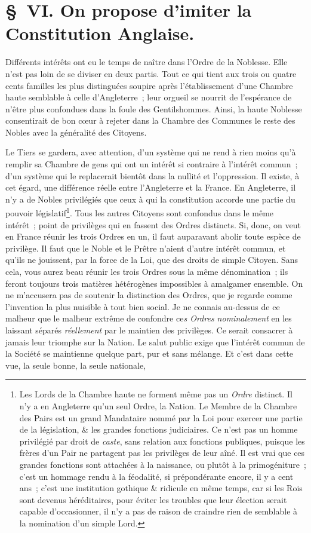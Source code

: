 \documentclass[french,twoside]{book} %
\begin{document}
\section[{§ VI. On propose d’imiter la Constitution Anglaise.}]{§ VI. On propose d’imiter la Constitution Anglaise.}
\noindent Différents intérêts ont eu le temps de naître dans l’Ordre de la Noblesse. Elle n’est pas loin de se diviser en deux partis. Tout ce qui tient aux trois ou quatre cents familles les plus distinguées soupire après l’établissement d’une Chambre haute semblable à celle d’Angleterre ; leur orgueil se nourrit de l’espérance de n’être plus confondues dans la foule des Gentilshommes. Ainsi, la haute Noblesse consentirait de bon cœur à rejeter dans la Chambre des Communes le reste des Nobles avec la généralité des Citoyens.\par
Le Tiers se gardera, avec attention, d’un système qui ne rend à rien moins qu’à remplir sa Chambre de gens qui ont un intérêt si contraire à l’intérêt commun ; d’un système qui le replacerait bientôt dans la nullité et l’oppression. Il existe, à cet égard, une différence réelle entre l’Angleterre et la France. En Angleterre, il n’y a de Nobles privilégiés que ceux à qui la constitution accorde une partie du pouvoir législatif\footnote{Les Lords de la Chambre haute ne forment même pas un {\itshape Ordre} distinct. Il n’y a en Angleterre qu’un seul Ordre, la Nation. Le Membre de la Chambre des Pairs est un grand Mandataire nommé par la Loi pour exercer une partie de la législation, \& les grandes fonctions judiciaires. Ce n’est pas un homme privilégié par droit de {\itshape caste}, sans relation aux fonctions publiques, puisque les frères d’un Pair ne partagent pas les privilèges de leur aîné. Il est vrai que ces grandes fonctions sont attachées à la naissance, ou plutôt à la primogéniture ; c’est un hommage rendu à la féodalité, si prépondérante encore, il y a cent ans ; c’est une institution gothique \& ridicule en même temps, car si les Rois sont devenus héréditaires, pour éviter les troubles que leur élection serait capable d’occasionner, il n’y a pas de raison de craindre rien de semblable à la nomination d’un simple Lord.}. Tous les autres Citoyens sont confondus dans le même intérêt ; point de privilèges qui en fassent des Ordres distincts. Si, donc, on veut en France réunir les trois Ordres en un, il faut auparavant abolir toute espèce de privilège. Il faut que le Noble et le Prêtre n’aient d’autre intérêt commun, et qu’ils ne jouissent, par la force de la Loi, que des droits de simple Citoyen. Sans cela, vous aurez beau réunir les trois Ordres sous la même dénomination ; ils feront toujours trois matières hétérogènes impossibles à amalgamer ensemble. On ne m’accusera pas de soutenir la distinction des Ordres, que je regarde comme l’invention la plus nuisible à tout bien social. Je ne connais au-dessus de ce malheur que le malheur extrême de confondre ce{\itshape s Ordres nominalement} en les laissant séparés {\itshape réellement} par le maintien des privilèges. Ce serait consacrer à jamais leur triomphe sur la Nation. Le salut public exige que l’intérêt commun de la Société se maintienne quelque part, pur et sans mélange. Et c’est dans cette vue, la seule bonne, la seule nationale, 
\end{document}
